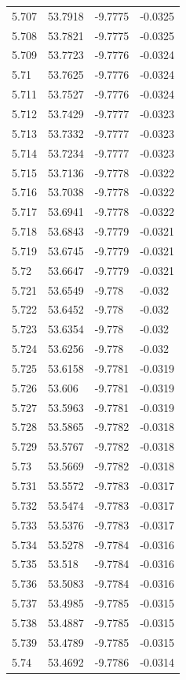 \begin{tabular}{llll}
5.707 & 53.7918 & -9.7775 & -0.0325 \\
5.708 & 53.7821 & -9.7775 & -0.0325 \\
5.709 & 53.7723 & -9.7776 & -0.0324 \\
5.71 & 53.7625 & -9.7776 & -0.0324 \\
5.711 & 53.7527 & -9.7776 & -0.0324 \\
5.712 & 53.7429 & -9.7777 & -0.0323 \\
5.713 & 53.7332 & -9.7777 & -0.0323 \\
5.714 & 53.7234 & -9.7777 & -0.0323 \\
5.715 & 53.7136 & -9.7778 & -0.0322 \\
5.716 & 53.7038 & -9.7778 & -0.0322 \\
5.717 & 53.6941 & -9.7778 & -0.0322 \\
5.718 & 53.6843 & -9.7779 & -0.0321 \\
5.719 & 53.6745 & -9.7779 & -0.0321 \\
5.72 & 53.6647 & -9.7779 & -0.0321 \\
5.721 & 53.6549 & -9.778 & -0.032 \\
5.722 & 53.6452 & -9.778 & -0.032 \\
5.723 & 53.6354 & -9.778 & -0.032 \\
5.724 & 53.6256 & -9.778 & -0.032 \\
5.725 & 53.6158 & -9.7781 & -0.0319 \\
5.726 & 53.606 & -9.7781 & -0.0319 \\
5.727 & 53.5963 & -9.7781 & -0.0319 \\
5.728 & 53.5865 & -9.7782 & -0.0318 \\
5.729 & 53.5767 & -9.7782 & -0.0318 \\
5.73 & 53.5669 & -9.7782 & -0.0318 \\
5.731 & 53.5572 & -9.7783 & -0.0317 \\
5.732 & 53.5474 & -9.7783 & -0.0317 \\
5.733 & 53.5376 & -9.7783 & -0.0317 \\
5.734 & 53.5278 & -9.7784 & -0.0316 \\
5.735 & 53.518 & -9.7784 & -0.0316 \\
5.736 & 53.5083 & -9.7784 & -0.0316 \\
5.737 & 53.4985 & -9.7785 & -0.0315 \\
5.738 & 53.4887 & -9.7785 & -0.0315 \\
5.739 & 53.4789 & -9.7785 & -0.0315 \\
5.74 & 53.4692 & -9.7786 & -0.0314 \\

\end{tabular}
